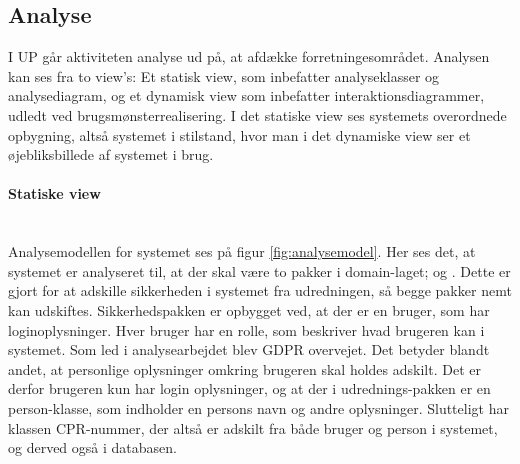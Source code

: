 \documentclass[../../main.tex]{subfiles}
\begin{document}
\subsection{Analyse}\label{sec:analyse}
I UP går aktiviteten analyse ud på, at afdække forretningesområdet. Analysen kan ses fra to view's: Et statisk view, som inbefatter analyseklasser og analysediagram, og et dynamisk view som inbefatter interaktionsdiagrammer, udledt ved brugsmønsterrealisering. I det statiske view ses systemets overordnede opbygning, altså systemet i stilstand, hvor man i det dynamiske view ser et øjebliksbillede af systemet i brug. 

\paragraph{Statiske view} \mbox{} \\
Analysemodellen for systemet ses på figur \ref{fig:analysemodel}. Her ses det, at systemet er analyseret til, at der skal være to pakker i domain-laget;  og . Dette er gjort for at adskille sikkerheden i systemet fra udredningen, så begge pakker nemt kan udskiftes. Sikkerhedspakken er opbygget ved, at der er en bruger, som har loginoplysninger. Hver bruger har en rolle, som beskriver hvad brugeren kan i systemet. Som led i analysearbejdet blev GDPR overvejet. Det betyder blandt andet, at personlige oplysninger omkring brugeren skal holdes adskilt. Det er derfor brugeren kun har login oplysninger, og at der i udrednings-pakken er en person-klasse, som indholder en persons navn og andre oplysninger. Slutteligt har klassen  CPR-nummer, der altså er adskilt fra både bruger og person i systemet, og derved også i databasen. 
\end{document}
